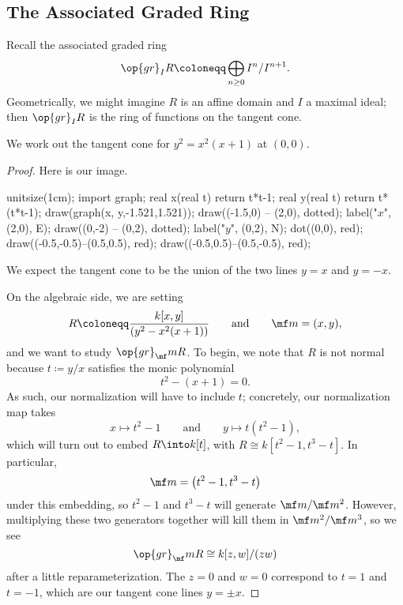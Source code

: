 \documentclass[../notes.tex]{subfiles}
\begin{document}
\subsection{The Associated Graded Ring}
Recall the associated graded ring
\[\op{gr}_IR\coloneqq\bigoplus_{n\ge0}I^n/I^{n+1}.\]
Geometrically, we might imagine $R$ is an affine domain and $I$ a maximal ideal; then $\op{gr}_IR$ is the ring of functions on the tangent cone.
\begin{exe}
	We work out the tangent cone for $y^2=x^2(x+1)$ at $(0,0)$.
\end{exe}
\begin{proof}
	Here is our image.
	\begin{center}
		\begin{asy}
			unitsize(1cm);
			import graph;
			real x(real t)
			{
				return t*t-1;
			}
			real y(real t)
			{
				return t*(t*t-1);
			}
			draw(graph(x, y,-1.521,1.521));
			draw((-1.5,0) -- (2,0), dotted); label("$x$", (2,0), E);
			draw((0,-2) -- (0,2), dotted); label("$y$", (0,2), N);
			dot((0,0), red);
			draw((-0.5,-0.5)--(0.5,0.5), red);
			draw((-0.5,0.5)--(0.5,-0.5), red);
		\end{asy}
	\end{center}
	We expect the tangent cone to be the union of the two lines $y=x$ and $y=-x$.

	On the algebraic side, we are setting
	\[R\coloneqq\frac{k[x,y]}{\left(y^2-x^2(x+1)\right)}\qquad\text{and}\qquad\mf m=(x,y),\]
	and we want to study $\op{gr}_\mf mR$. To begin, we note that $R$ is not normal because $t\coloneqq y/x$ satisfies the monic polynomial
	\[t^2-(x+1)=0.\]
	As such, our normalization will have to include $t$; concretely, our normalization map takes
	\[x\mapsto t^2-1\qquad\text{and}\qquad y\mapsto t\left(t^2-1\right),\]
	which will turn out to embed $R\into k[t]$, with $R\cong k\left[t^2-1,t^3-t\right]$. In particular,
	\[\mf m=\left(t^2-1,t^3-t\right)\]
	under this embedding, so $t^2-1$ and $t^3-t$ will generate $\mf m/\mf m^2$. However, multiplying these two generators together will kill them in $\mf m^2/\mf m^3$, so we see
	\[\op{gr}_\mf mR\cong k[z,w]/(zw)\]
	after a little reparameterization. The $z=0$ and $w=0$ correspond to $t=1$ and $t=-1$, which are our tangent cone lines $y=\pm x$.
\end{proof}
\end{document}
